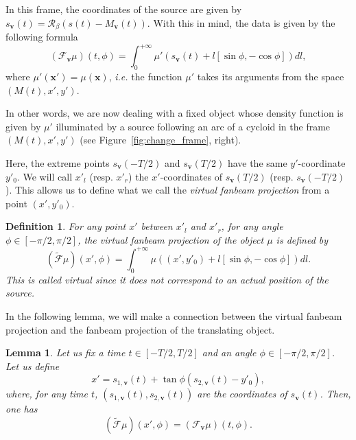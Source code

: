 \documentclass[9pt,technote]{IEEEtran}
\numberwithin{equation}{section}
\newcommand{\ie}{\emph{i.e.} }
\newcommand{\bx}{\mathbf{x}}
\newcommand{\bv}{\mathbf{v}}
\newcommand{\Mbv}{M_{\mathbf{v}}}
\newcommand{\Tbv}{\mathcal{F}_{\mathbf{v}}}
\newcommand{\sbv}{s_{\mathbf{v}}}
\newtheorem{definition}{Definition}
\newtheorem{lemma}{Lemma}
\begin{document}
In this frame, the coordinates of the source are given by $\sbv(t)=\mathcal{R}_{\beta} \left( s(t)-\Mbv(t) \right)$. With this in mind, the data is given by the following formula
\begin{equation}
	(\Tbv\mu)(t,\phi) = \int_0^{+\infty} \mu' \left( s_{\bv}(t) + l \left[ \sin \phi, -\cos \phi \right] \right) dl,
\end{equation}
where $\mu'(\bx')=\mu(\bx)$, \ie the function $\mu'$ takes its arguments from the space $\left(M(t), x', y'\right)$.

In other words, we are now dealing with a fixed object whose density function is given by $\mu'$ illuminated by a source following an arc of a cycloid in the frame $\left(M(t), x', y'\right)$ (see Figure~\ref{fig:change_frame}, right).

Here, the extreme points $\sbv(-T/2)$ and $\sbv(T/2)$ have the same $y'$-coordinate $y'_0$. We will call $x'_l$ (resp. $x'_r$) the $x'$-coordinates of $\sbv(T/2)$ (resp. $\sbv(-T/2)$). This allows us to define what we call the \emph{virtual fanbeam projection} from a point $(x',y'_0)$.
\begin{definition}
	For any point $x'$ between $x'_l$ and $x'_r$, for any angle $\phi \in \left[ -\pi/2, \pi/2\right]$, the \emph{virtual fanbeam projection} of the object $\mu$ is defined by
\begin{equation}
	\left( \tilde{\mathcal{F}}\mu	\right)(x',\phi) = \int_0^{+\infty} \mu \left( (x',y'_0) + l \left[ \sin \phi, -\cos \phi \right] \right) dl.
\end{equation}
This is called \emph{virtual} since it does not correspond to an actual position of the source.
\end{definition}

In the following lemma, we will make a connection between the virtual fanbeam projection and the fanbeam projection of the translating object.
\begin{lemma}
	Let us fix a time $t \in \left[ -T/2, T/2\right]$ and an angle $\phi \in \left[ -\pi/2, \pi/2\right]$. Let us define
	\begin{equation}
		x' = s_{1,\bv}(t) + \tan \phi \left( s_{2,\bv}(t) - y'_0 \right),
	\end{equation}
	where, for any time $t$, $\left( s_{1,\bv}(t), s_{2,\bv}(t) \right)$ are the coordinates of $\sbv(t)$.
	Then, one has
	\begin{equation}
		\left( \tilde{\mathcal{F}}\mu	\right)(x',\phi) = \left( \Tbv \mu \right)(t,\phi).
	\end{equation}
\label{lem:T_x_t}
\end{lemma}
\end{document}
